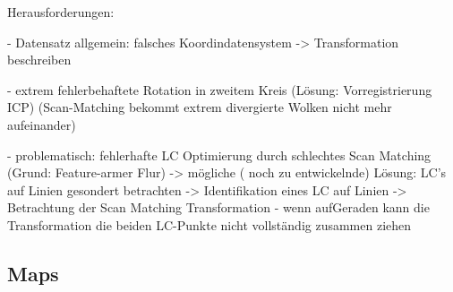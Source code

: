Herausforderungen:

- Datensatz allgemein: falsches Koordindatensystem -> Transformation beschreiben

- extrem fehlerbehaftete Rotation in zweitem Kreis (Lösung: Vorregistrierung ICP)
(Scan-Matching bekommt extrem divergierte Wolken nicht mehr aufeinander)

- problematisch: fehlerhafte LC Optimierung durch schlechtes Scan Matching (Grund: Feature-armer Flur) -> mögliche ( noch zu entwickelnde) Lösung: LC's auf Linien gesondert betrachten -> Identifikation eines LC auf Linien -> Betrachtung der Scan Matching Transformation - wenn aufGeraden kann die Transformation die beiden LC-Punkte nicht vollständig zusammen ziehen

\subsection{Maps}

